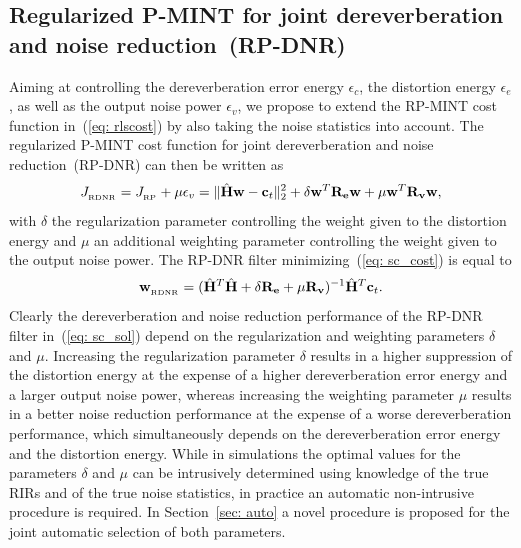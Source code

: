 \documentclass[draftcls,onecolumn,11pt]{IEEEtran}
\begin{document}
\subsection{Regularized P-MINT  for joint dereverberation and noise reduction~(RP-DNR)}
\label{sec: rpdnr}
Aiming at controlling the dereverberation error energy $\epsilon_{c}$, the distortion energy $\epsilon_{e}$, as well as the output noise power $\epsilon_v$, we propose to extend the RP-MINT cost function in~(\ref{eq: rlscost}) by also taking the noise statistics into account.
The regularized P-MINT cost function for joint dereverberation and noise reduction~(RP-DNR) can then be written as 
\begin{equation}
\label{eq: sc_cost}
J_{_{\rm RDNR}}  = J_{_{\rm RP}} + \mu \epsilon_{v} = \|\hat{\mathbf{H}}\mathbf{w} - \mathbf{c}_t \|_2^2 + \delta \mathbf{w}^T \mathbf{R}_{\mathbf{e}}\mathbf{w} + \mu \mathbf{w}^T \mathbf{R}_{\mathbf{v}}\mathbf{w},
\end{equation}
with $\delta$ the regularization parameter controlling the weight given to the distortion energy and $\mu$ an additional weighting parameter controlling the weight given to the output noise power. 
The RP-DNR filter minimizing~(\ref{eq: sc_cost}) is equal to
\begin{equation}
\label{eq: sc_sol}
\mathbf{w}_{_{\rm RDNR}} = (\hat{\mathbf{H}}^T\hat{\mathbf{H}} + \delta\mathbf{R}_{\mathbf{e}}+ \mu \mathbf{R}_{\mathbf{v}})^{-1}\hat{\mathbf{H}}^T\mathbf{c}_t.
\end{equation}
Clearly the dereverberation and noise reduction performance of the RP-DNR filter in~(\ref{eq: sc_sol}) depend on the regularization and weighting parameters $\delta$ and $\mu$.
Increasing the regularization parameter $\delta$ results in a higher suppression of the distortion energy at the expense of a higher dereverberation error energy and a larger output noise power, whereas increasing the weighting parameter $\mu$ results in a better noise reduction performance at the expense of a worse dereverberation performance, which simultaneously depends on the dereverberation error energy and the distortion energy.
While in simulations the optimal values for the parameters $\delta$ and $\mu$ can be intrusively determined using knowledge of the true RIRs and of the true noise statistics, in practice an automatic non-intrusive procedure is required.
In Section~\ref{sec: auto} a novel procedure is proposed for the joint automatic selection of both parameters.
\end{document}
